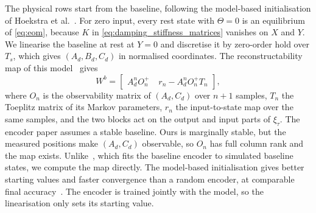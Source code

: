 The physical rows start from the baseline, following the model-based
initialisation of Hoekstra et al.~\cite[Sec.~3.1]{hoekstra2026encoder}.
For zero input, every rest state with $\Theta=0$ is an equilibrium of
\eqref{eq:eom}, because
$K$ in \eqref{eq:damping_stiffness_matrices} vanishes on $X$ and $Y$.
We linearise the baseline at rest at $Y=0$ and discretise it by zero-order
hold over $T_s$, which gives $(A_d,B_d,C_d)$ in normalised coordinates.
The reconstructability map of this model~\cite[Eqs.~(15) to (17)]{hoekstra2026encoder}
gives
\begin{equation}
 W^b=\begin{bmatrix}
  A_d^nO_n^{+} & \;r_n-A_d^nO_n^{+}T_n
 \end{bmatrix},
 \label{eq:aug_wb}
\end{equation}
where $O_n$ is the observability matrix of $(A_d,C_d)$ over $n+1$ samples,
$T_n$ the Toeplitz matrix of its Markov parameters, $r_n$ the input-to-state
map over the same samples, and the two blocks act on the output and input
parts of $\xi_\tau$.
The encoder paper assumes a stable baseline.
Ours is marginally stable, but the measured positions make $(A_d,C_d)$
observable, so $O_n$ has full column rank and the map exists.
Unlike~\cite[Eq.~(30)]{hoekstra2026lfr}, which fits the baseline encoder to
simulated baseline states, we compute the map directly.
The model-based initialisation gives better starting values and faster
convergence than a random encoder, at comparable final
accuracy~\cite[Sec.~4.4]{hoekstra2026encoder}.
The encoder is trained jointly with the model, so the linearisation only sets
its starting value.

